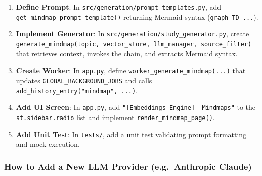 \documentclass[
]{article}
\providecommand{\tightlist}{%
  \setlength{\itemsep}{0pt}\setlength{\parskip}{0pt}}
\begin{document}
\begin{enumerate}
\def\labelenumi{\arabic{enumi}.}
\tightlist
\item
  \textbf{Define Prompt}: In
  \texttt{src/\allowbreak generation/\allowbreak prompt\_\allowbreak templates.\allowbreak py}, add
  \texttt{get\_\allowbreak mindmap\_\allowbreak prompt\_\allowbreak template(\allowbreak )\allowbreak } returning Mermaid syntax
  (\texttt{graph\ \allowbreak TD\ \allowbreak .\allowbreak .\allowbreak .}).
\item
  \textbf{Implement Generator}: In
  \texttt{src/\allowbreak generation/\allowbreak study\_\allowbreak generator.\allowbreak py}, create
  \texttt{generate\_\allowbreak mindmap(\allowbreak topic,\allowbreak \ \allowbreak vector\_\allowbreak store,\allowbreak \ \allowbreak llm\_\allowbreak manager,\allowbreak \ \allowbreak source\_\allowbreak filter)\allowbreak }
  that retrieves context, invokes the chain, and extracts Mermaid
  syntax.
\item
  \textbf{Create Worker}: In \texttt{app.\allowbreak py}, define
  \texttt{worker\_\allowbreak generate\_\allowbreak mindmap(\allowbreak .\allowbreak .\allowbreak .)\allowbreak } that updates
  \texttt{GLOBAL\_\allowbreak BACKGROUND\_\allowbreak JOBS} and calls
  \texttt{add\_\allowbreak history\_\allowbreak entry(\allowbreak "mindmap",\allowbreak \ \allowbreak .\allowbreak .\allowbreak .)\allowbreak }.
\item
  \textbf{Add UI Screen}: In \texttt{app.\allowbreak py}, add
  \texttt{"{[}Embeddings\ \allowbreak Engine{]}\ \allowbreak \ \allowbreak Mindmaps"} to the
  \texttt{st.\allowbreak sidebar.\allowbreak radio} list and implement
  \texttt{render\_\allowbreak mindmap\_\allowbreak page(\allowbreak )\allowbreak }.
\item
  \textbf{Add Unit Test}: In \texttt{tests/\allowbreak }, add a unit test validating
  prompt formatting and mock execution.
\end{enumerate}

\subsubsection{How to Add a New LLM Provider (e.g.~Anthropic
Claude)}\label{how-to-add-a-new-llm-provider-e.g.-anthropic-claude}
\end{document}
